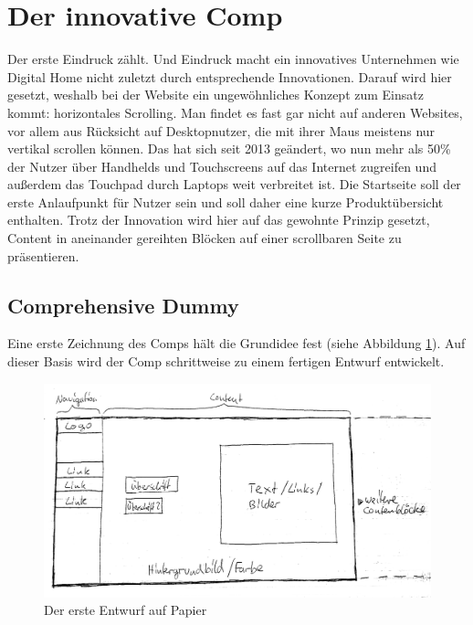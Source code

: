 \section{Der innovative Comp}
Der erste Eindruck zählt. Und Eindruck macht ein innovatives Unternehmen wie Digital Home nicht zuletzt durch entsprechende Innovationen.
Darauf wird hier gesetzt, weshalb bei der Website ein ungewöhnliches Konzept zum Einsatz kommt: horizontales Scrolling. Man findet es fast gar nicht auf anderen Websites, vor allem aus Rücksicht auf Desktopnutzer, die mit ihrer Maus meistens nur vertikal scrollen können. Das hat sich seit 2013 geändert, wo nun mehr als 50\% der Nutzer über Handhelds und Touchscreens auf das Internet zugreifen und außerdem das Touchpad durch Laptops weit verbreitet ist.
Die Startseite soll der erste Anlaufpunkt für Nutzer sein und soll daher eine kurze Produktübersicht enthalten. Trotz der Innovation wird hier auf das gewohnte Prinzip gesetzt, Content in aneinander gereihten Blöcken auf einer scrollbaren Seite zu präsentieren.

	\subsection{Comprehensive Dummy}

Eine erste Zeichnung des Comps hält die Grundidee fest (siehe Abbildung \ref{inno_Comp1}). Auf dieser Basis wird der Comp schrittweise zu einem fertigen Entwurf entwickelt.

\begin{figure} [hp]
\includegraphics[width=\textwidth]{./img/inno_comp1.png}
\caption{Der erste Entwurf auf Papier}
\label{inno_Comp1}
\end{figure}
